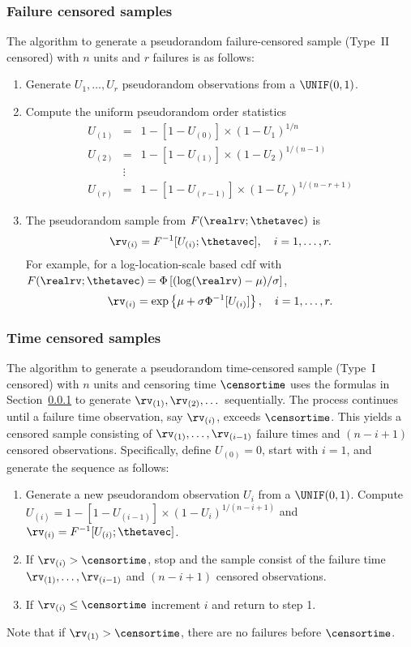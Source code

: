 \subsubsection{Failure censored samples}
\label{section:failcensam}
The algorithm to generate a pseudorandom failure-censored sample
(Type~II censored) with $n$ units and $r$ failures is as follows:
\begin{enumerate}
\item
Generate $U_{1}, \dots, U_{r}$ pseudorandom observations from
a $\UNIF(0,1)$.
\item
Compute the uniform pseudorandom order statistics
\begin{eqnarray*}
U_{(1)}&=& 1-[1-U_{(0)}]\times(1-U_{1})^{1/n}
\\
U_{(2)}&=& 1-[1-U_{(1)}]\times (1-U_{2})^{1/(n-1)}
\\
& \vdots &
\\
U_{(r)}&=& 1-[1-U_{(r-1)}] \times (1-U_{r})^{1/(n-r+1)}
\end{eqnarray*}
\item
The pseudorandom sample from $F(\realrv;\thetavec)$ is
\begin{displaymath}
\rv_{(i)}=F^{-1}[U_{(i)};\thetavec], \quad i=1, \dots, r.
\end{displaymath}
For example, for a log-location-scale based
cdf with  $F(\realrv; \thetavec)=\Phi \left [ 
(\log(\realrv)-\mu)/\sigma
		            \right ]$,
\begin{displaymath}
\rv_{(i)}=\exp \left \{
\mu+\sigma \Phi^{-1}[U_{(i)}]
	       \right \}, \quad i=1, \dots, r.
\end{displaymath}
\end{enumerate}
\subsubsection{Time censored samples}
The algorithm to generate a pseudorandom time-censored sample
(Type~I censored) with $n$ units and censoring time $\censortime$
uses the formulas in Section~\ref{section:failcensam} to generate
$\rv_{(1)},\rv_{(2)}, \dots$ sequentially. The process continues
until a failure time observation, say $\rv_{(i)}$, exceeds
$\censortime$. This yields a censored sample consisting of
$\rv_{(1)}, \dots,
\rv_{(i-1)}$ failure times and $(n-i+1)$ censored observations. Specifically,
define $U_{(0)} = 0$, start with $i=1$, and generate the sequence as follows:
\begin{enumerate}
\item
Generate a new pseudorandom observation $U_{i}$ from a $\UNIF(0,1)$.
Compute $U_{(i)}=1-[1-U_{(i-1)}] \times \left (1-U_{i} \right )^{1/(n-i+1)}$ 
and  $\rv_{(i)}=F^{-1}[U_{(i)}; \thetavec ]$.
\item
If $\rv_{(i)} > \censortime$, stop and the sample consist 
of the failure time $\rv_{(1)}, \dots, \rv_{(i-1)}$ 
and $(n-i+1)$ censored observations. 
\item
If $\rv_{(i)} \le \censortime$ increment $i$ and return to step 1.
\end{enumerate}
Note that if $\rv_{(1)} >
\censortime$,
there are no failures before $\censortime$.



